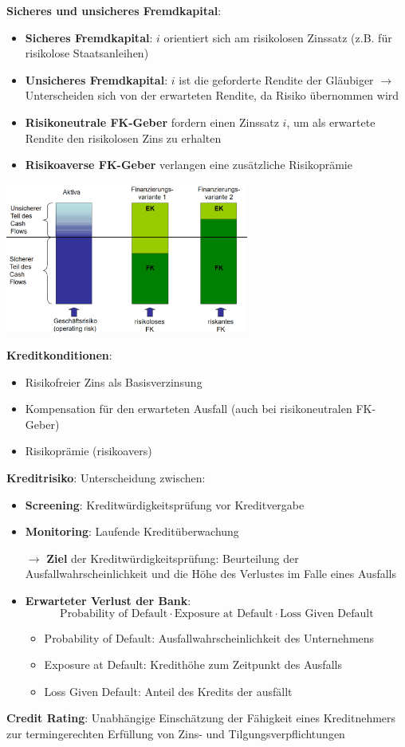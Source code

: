 \textbf{Sicheres und unsicheres Fremdkapital}:
\begin{itemize}
	\item \textbf{Sicheres Fremdkapital}: $i$ orientiert sich am risikolosen Zinssatz (z.B. für risikolose Staatsanleihen)
	\item \textbf{Unsicheres Fremdkapital}: $i$ ist die geforderte Rendite der Gläubiger $\rightarrow$ Unterscheiden sich von der erwarteten Rendite, da Risiko übernommen wird
	\item \textbf{Risikoneutrale FK-Geber} fordern einen Zinssatz $i$, um als erwartete Rendite den risikolosen Zins zu erhalten
	\item \textbf{Risikoaverse FK-Geber} verlangen eine zusätzliche Risikoprämie
\end{itemize}
\begin{center}
	\includegraphics[width=0.6\textwidth]{images/sicher-unsicher.png}
\end{center}

\textbf{Kreditkonditionen}:
\begin{itemize}
	\item Risikofreier Zins als Basisverzinsung
	\item Kompensation für den erwarteten Ausfall (auch bei risikoneutralen FK-Geber)
	\item Risikoprämie (risikoavers)
\end{itemize}
\bigskip
\textbf{Kreditrisiko}: Unterscheidung zwischen:
\begin{itemize}
	\item \textbf{Screening}: Kreditwürdigkeitsprüfung vor Kreditvergabe
	\item \textbf{Monitoring}: Laufende Kreditüberwachung
	
	$\rightarrow$ \textbf{Ziel} der Kreditwürdigkeitsprüfung: Beurteilung der Ausfallwahrscheinlichkeit und die Höhe des Verlustes im Falle eines Ausfalls
	
	\item \textbf{Erwarteter Verlust der Bank}: $$\text{Probability of Default} \cdot \text{Exposure at Default} \cdot \text{Loss Given Default}$$
	\begin{itemize}
		\item Probability of Default: Ausfallwahrscheinlichkeit des Unternehmens
		\item Exposure at Default: Kredithöhe zum Zeitpunkt des Ausfalls
		\item Loss Given Default: Anteil des Kredits der ausfällt
	\end{itemize}
\end{itemize}
\bigskip
\textbf{Credit Rating}: Unabhängige Einschätzung der Fähigkeit eines Kreditnehmers zur termingerechten Erfüllung von Zins- und Tilgungsverpflichtungen

